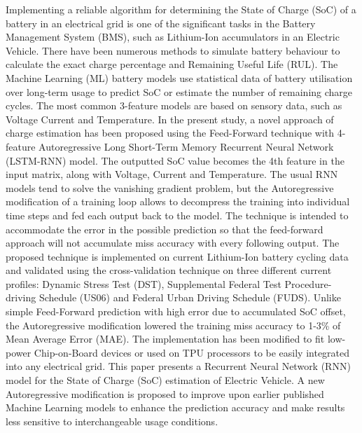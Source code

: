 %
 {
Implementing a reliable algorithm for determining the State of Charge (SoC) of a battery in an electrical grid is one of the significant tasks in the Battery Management System (BMS), such as Lithium-Ion accumulators in an Electric Vehicle.
There have been numerous methods to simulate battery behaviour to calculate the exact charge percentage and Remaining Useful Life (RUL).
The Machine Learning (ML) battery models use statistical data of battery utilisation over long-term usage to predict SoC or estimate the number of remaining charge cycles.
The most common 3-feature models are based on sensory data, such as Voltage Current and Temperature.
In the present study, a novel approach of charge estimation has been proposed using the Feed-Forward technique with 4-feature Autoregressive Long Short-Term Memory Recurrent Neural Network (LSTM-RNN) model.
The outputted SoC value becomes the 4th feature in the input matrix, along with Voltage, Current and Temperature.
The usual RNN models tend to solve the vanishing gradient problem, but the Autoregressive modification of a training loop allows to decompress the training into individual time steps and fed each output back to the model.
The technique is intended to accommodate the error in the possible prediction so that the feed-forward approach will not accumulate miss accuracy with every following output.
The proposed technique is implemented on current Lithium-Ion battery cycling data and validated using the cross-validation technique on three different current profiles: Dynamic Stress Test (DST), Supplemental Federal Test Procedure-driving Schedule (US06) and Federal Urban Driving Schedule (FUDS).
Unlike simple Feed-Forward prediction with high error due to accumulated  SoC offset, the Autoregressive modification lowered the training miss accuracy to 1-3\% of Mean Average Error (MAE).
The implementation has been modified to fit low-power Chip-on-Board devices or used on TPU processors to be easily integrated into any electrical grid.
}{
        This paper presents a Recurrent Neural Network (RNN) model for the State of Charge (SoC) estimation of Electric Vehicle.
        A new Autoregressive modification is proposed to improve upon earlier published Machine Learning models to enhance the prediction accuracy and make results less sensitive to interchangeable usage conditions.
}
